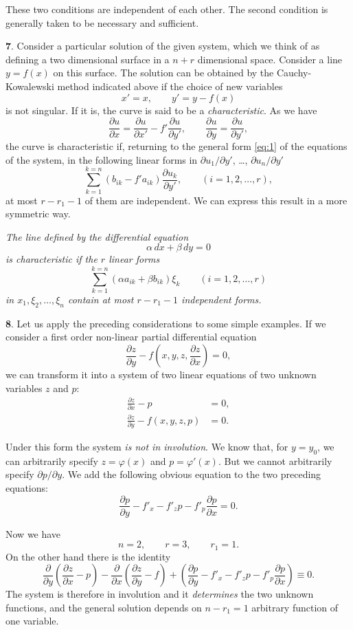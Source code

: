 \documentclass[leqno,11pt]{article}
\newcommand{\pd}{\partial}
\theoremstyle{shape1}
\theoremstyle{shape0}
\theoremstyle{shape2}
\theoremstyle{definition}
\begin{document}
These two conditions are independent of each other. The second condition is generally taken to be necessary and sufficient.

\vspace{12pt}

\textbf{7}. Consider a particular solution of the given system, which we think of as defining a two dimensional surface in a $n+r$ dimensional space. Consider a line $y=f(x)$ on this surface. The solution can be obtained by the Cauchy-Kowalewski method indicated above if the choice of new variables 
\[
x'=x,\qquad y'=y-f(x)
\]
is not singular. If it is, the curve is said to be a \emph{characteristic}. As we have
\[
\frac{\pd u}{\pd x}=\frac{\pd u}{\pd x'}-f'\frac{\pd u}{\pd y'},\qquad \frac{\pd u}{\pd y}=\frac{\pd u}{\pd y'},
\]
the curve is characteristic if, returning to the general form \eqref{eq:1} of the equations of the system, in the following linear forms in $\pd u_{1}/\pd y'$, \dots , $\pd u_{n}/\pd y'$
\[
\sum_{k=1}^{k=n}(b_{ik}-f'a_{ik})\frac{\pd u_{k}}{\pd y'},\qquad(i=1,2,\dots,r),
\]
at most $r-r_{1}-1$ of them are independent. We can express this result in a more symmetric way.

\emph{The line defined by the differential equation}
\[
\alpha\,dx+\beta\,dy=0
\]
\emph{is characteristic if the $r$ linear forms}
\[
\sum_{k=1}^{k=n}(\alpha a_{ik}+\beta b_{ik})\xi_{k}\qquad(i=1,2,\dots,r)
\]
\emph{in $x_{1},\xi_{2},\dots,\xi_{n}$ contain at most $r-r_{1}-1$ independent forms.}

\vspace{12pt}

\textbf{8}. Let us apply the preceding considerations to some simple examples. If we consider a first order non-linear partial differential equation
\[
\frac{\pd z}{\pd y}-f\left(x,y,z,\frac{\pd z}{\pd x}\right)=0,
\]
we can transform it into a system of two linear equations of two unknown variables $z$ and $p$:
\begin{align*}
  \frac{\pd z}{\pd x}-p&=0,\\
  \frac{\pd z}{\pd y}-f(x,y,z,p)&=0.
\end{align*}

Under this form the system \emph{is not in involution}. We know that, for $y=y_{0}$, we can arbitrarily specify $z=\varphi(x)$ and $p=\varphi'(x)$. But we cannot arbitrarily specify $\pd p/\pd y$. We add the following obvious equation to the two preceding equations:
\[
\frac{\pd p}{\pd y}-f'_{x}-f'_{z}p-f'_{p}\frac{\pd p}{\pd x}=0.
\]

Now we have
\[
n=2,\qquad r=3,\qquad r_{1}=1.
\]
On the other hand there is the identity
\[
\frac{\pd}{\pd y}\left(\frac{\pd z}{\pd x}-p\right)-\frac{\pd}{\pd x}\left(\frac{\pd z}{\pd y}-f\right)+\left(\frac{\pd p}{\pd y}-f'_{x}-f'_{z}p-f'_{p}\frac{\pd p}{\pd x}\right)\equiv 0.
\]
The system is therefore in involution and it \emph{determines} the two unknown functions, and the general solution depends on $n-r_{1}=1$ arbitrary function of one variable.
\end{document}
